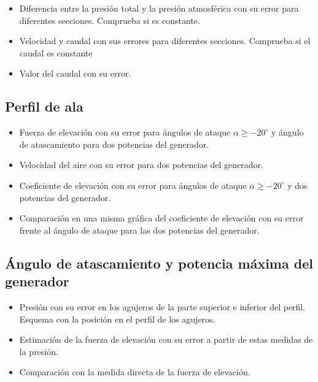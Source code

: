 \documentclass[11pt]{articulo}
\begin{document}
\begin{itemize}

\item{Diferencia entre la presi\'on total y la presi\'on atmosf\'erica con su error para diferentes secciones. Comprueba si es constante.}
\item{Velocidad y caudal con sus errores para diferentes secciones. Comprueba si el caudal es constante}
\item{Valor del caudal con su error.}

\end{itemize}

\subsection*{Perfil de ala}

\begin{itemize}

\item{Fuerza de elevaci\'on con su error para \'angulos de ataque $\alpha \geq -20^{\circ}$ y \'angulo de atascamiento para dos potencias del generador.}
\item{Velocidad del aire con su error para dos potencias del generador.}
\item{Coeficiente de elevaci\'on con su error para \'angulos de ataque $\alpha \geq -20^{\circ}$ y dos potencias del generador.}
\item{Comparaci\'on en una misma gr\'afica del coeficiente de elevaci\'on con su error frente al \'angulo de ataque para las dos potencias del generador.}

\end{itemize}

\subsection*{\'Angulo de atascamiento y potencia m\'axima del generador}

\begin{itemize}

\item{Presi\'on con su error en los agujeros de la parte superior e inferior del perfil. Esquema con la posici\'on en el perfil de los agujeros.}
\item{Estimaci\'on de la fuerza de elevaci\'on con su error a partir de estas medidas de la presi\'on.}
\item{Comparaci\'on con la medida directa de la fuerza de elevaci\'on.}

\end{itemize}
\end{document}
